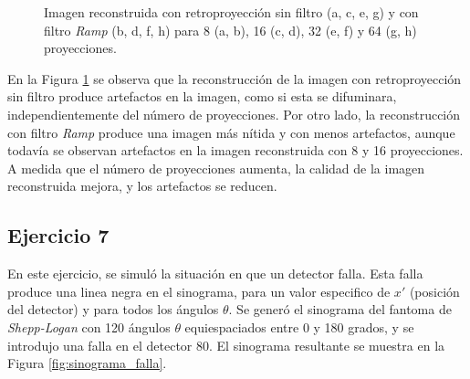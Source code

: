 \documentclass[11pt, twocolumn]{article}
\begin{document}
\begin{figure}[htbp]
    \hfill
    \hfill
    \hfill
    \caption{Imagen reconstruida con retroproyección sin filtro (a, c, e, g) y con filtro \textit{Ramp} (b, d, f, h) para 8 (a, b), 16 (c, d), 32 (e, f) y 64 (g, h) proyecciones.}
    \label{fig: res_ej_6}
\end{figure}

En la Figura \ref{fig: res_ej_6} se observa que la reconstrucción de la imagen con retroproyección sin filtro produce artefactos en la imagen, como si esta se difuminara, independientemente del número de proyecciones. Por otro lado, la reconstrucción con filtro \textit{Ramp} produce una imagen más nítida y con menos artefactos, aunque todavía se observan artefactos en la imagen reconstruida con 8 y 16 proyecciones. A medida que el número de proyecciones aumenta, la calidad de la imagen reconstruida mejora, y los artefactos se reducen.

\subsection*{Ejercicio 7}
En este ejercicio, se simuló la situación en que un detector falla. Esta falla produce una linea negra en el sinograma, para un valor especifico de $x'$ (posición del detector) y para todos los ángulos $\theta$. Se generó el sinograma del fantoma de \textit{Shepp-Logan} con 120 ángulos $\theta$ equiespaciados entre 0 y 180 grados, y se introdujo una falla en el detector 80. El sinograma resultante se muestra en la Figura \ref{fig:sinograma_falla}.
\end{document}
